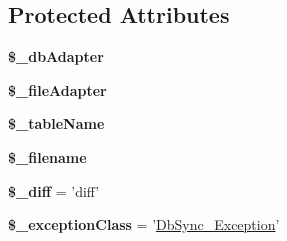 \subsection*{Protected Attributes}
\begin{DoxyCompactItemize}
\item 
\hypertarget{classDbSync__Table__AbstractTable_a0e14495b94bf28c946d7a358e451a0d9}{
{\bfseries \$\_\-dbAdapter}}
\label{classDbSync__Table__AbstractTable_a0e14495b94bf28c946d7a358e451a0d9}

\item 
\hypertarget{classDbSync__Table__AbstractTable_a54ff364459ce786ed1dde39a13b23ab9}{
{\bfseries \$\_\-fileAdapter}}
\label{classDbSync__Table__AbstractTable_a54ff364459ce786ed1dde39a13b23ab9}

\item 
\hypertarget{classDbSync__Table__AbstractTable_ad4b3983a04ca622b1fa53e5ae3572435}{
{\bfseries \$\_\-tableName}}
\label{classDbSync__Table__AbstractTable_ad4b3983a04ca622b1fa53e5ae3572435}

\item 
\hypertarget{classDbSync__Table__AbstractTable_a2a27a2cdcde4195d49b8a211b2748996}{
{\bfseries \$\_\-filename}}
\label{classDbSync__Table__AbstractTable_a2a27a2cdcde4195d49b8a211b2748996}

\item 
\hypertarget{classDbSync__Table__AbstractTable_ac9bdb64a866b5bcaa950f85c917bf655}{
{\bfseries \$\_\-diff} = 'diff'}
\label{classDbSync__Table__AbstractTable_ac9bdb64a866b5bcaa950f85c917bf655}

\item 
\hypertarget{classDbSync__Table__AbstractTable_aed634c197397fa86a615ba45845bf0d2}{
{\bfseries \$\_\-exceptionClass} = '\hyperlink{classDbSync__Exception}{DbSync\_\-Exception}'}
\label{classDbSync__Table__AbstractTable_aed634c197397fa86a615ba45845bf0d2}

\end{DoxyCompactItemize}


